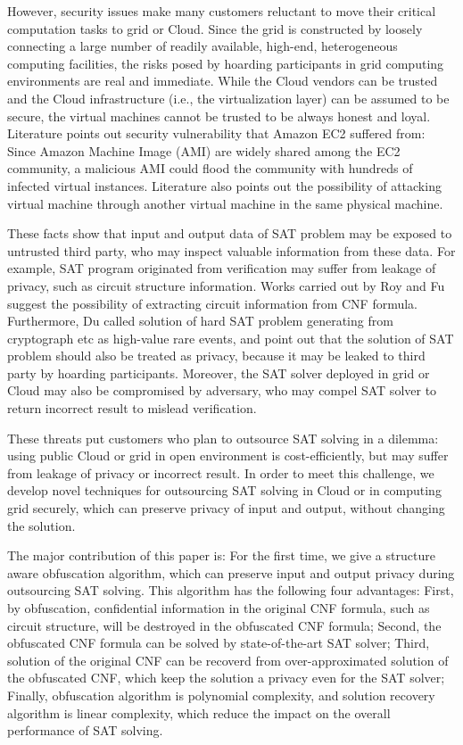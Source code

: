 \documentclass[conference]{IEEEtran}
\begin{document}
However, security issues make many customers reluctant to move their critical computation tasks to grid or Cloud.
Since the grid is constructed by loosely connecting a large number of readily available, high-end, heterogeneous computing facilities\cite{Nordugrid},
the risks posed by hoarding participants in grid computing environments are real and immediate\cite{HV-grid}.
While the Cloud vendors can be trusted and the Cloud infrastructure (i.e., the virtualization layer) can be assumed to be secure,
the virtual machines cannot be trusted to be always honest and loyal.
Literature\cite{AMI} points out security vulnerability that Amazon EC2 suffered from: 
Since Amazon Machine Image (AMI) are widely shared among the EC2 community,
a malicious AMI could flood the community with hundreds of infected virtual instances.
Literature \cite{InformationLeakageofCloud} also points out
the possibility of attacking virtual machine
through another virtual machine in the same physical machine.

These facts show that input and output data of SAT problem may be exposed to untrusted third party,
who may inspect valuable information from these data.
For example, SAT program originated from verification may suffer from leakage of privacy, such as circuit structure information.
Works carried out by Roy\cite{csRoy} and Fu \cite{csFu} suggest the possibility of extracting circuit information from CNF formula.
Furthermore, Du\cite{HV-grid} called solution of hard SAT problem generating from cryptograph etc as high-value rare events, 
and point out that the solution of SAT problem should also be treated as privacy, 
because it may be leaked to third party by hoarding participants.
Moreover, the SAT solver deployed in grid or Cloud may also be compromised by adversary, 
who may compel SAT solver to return incorrect result to  mislead verification.

These threats put customers who plan to outsource SAT solving in a dilemma:
using public Cloud or grid in open environment is cost-efficiently, 
but may suffer from leakage of privacy or incorrect result.
In order to meet this challenge, we develop novel techniques for outsourcing SAT solving in Cloud or in computing grid securely, 
which can preserve privacy of input and output, without changing the solution.

The major contribution of this paper is:
For the first time, we give a structure aware obfuscation algorithm, 
which can preserve input and output privacy during outsourcing SAT solving.
This algorithm has the following four advantages:
First, by obfuscation, confidential information in the original CNF formula,
such as circuit structure,
will be destroyed in the obfuscated CNF formula;
Second, the obfuscated CNF formula can be solved by state-of-the-art SAT solver;
Third, solution of the original CNF can be recoverd from over-approximated solution of the obfuscated CNF,
which keep the solution a privacy even for the SAT solver;
Finally, obfuscation algorithm is  polynomial complexity,
and solution recovery algorithm is linear complexity,
which reduce the impact on the overall performance of SAT solving.
\end{document}
